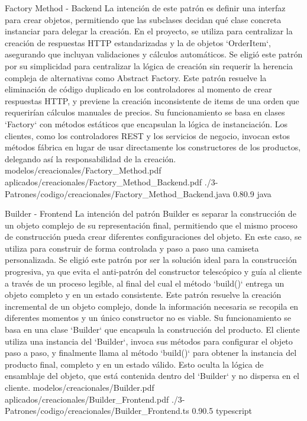 \Patron
    {Factory Method - Backend}
    {La intención de este patrón es definir una interfaz para crear objetos, permitiendo que las subclases decidan qué clase concreta instanciar para delegar la creación. En el proyecto, se utiliza para centralizar la creación de respuestas HTTP estandarizadas y la de objetos `OrderItem`, asegurando que incluyan validaciones y cálculos automáticos. Se eligió este patrón por su simplicidad para centralizar la lógica de creación sin requerir la herencia compleja de alternativas como Abstract Factory.}
    {Este patrón resuelve la eliminación de código duplicado en los controladores al momento de crear respuestas HTTP, y previene la creación inconsistente de items de una orden que requerirían cálculos manuales de precios. Su funcionamiento se basa en clases `Factory` con métodos estáticos que encapsulan la lógica de instanciación. Los clientes, como los controladores REST y los servicios de negocio, invocan estos métodos fábrica en lugar de usar directamente los constructores de los productos, delegando así la responsabilidad de la creación.}
    {modelos/creacionales/Factory_Method.pdf}
    {aplicados/creacionales/Factory_Method_Backend.pdf}
    {./3-Patrones/codigo/creacionales/Factory_Method_Backend.java}
    {0.8}{0.9}
    {java}
\newpage

\Patron
    {Builder - Frontend}
    {La intención del patrón Builder es separar la construcción de un objeto complejo de su representación final, permitiendo que el mismo proceso de construcción pueda crear diferentes configuraciones del objeto. En este caso, se utiliza para construir de forma controlada y paso a paso una camiseta personalizada. Se eligió este patrón por ser la solución ideal para la construcción progresiva, ya que evita el anti-patrón del constructor telescópico y guía al cliente a través de un proceso legible, al final del cual el método `build()` entrega un objeto completo y en un estado consistente.}
    {Este patrón resuelve la creación incremental de un objeto complejo, donde la información necesaria se recopila en diferentes momentos y un único constructor no es viable. Su funcionamiento se basa en una clase `Builder` que encapsula la construcción del producto. El cliente utiliza una instancia del `Builder`, invoca sus métodos para configurar el objeto paso a paso, y finalmente llama al método `build()` para obtener la instancia del producto final, completo y en un estado válido. Esto oculta la lógica de ensamblaje del objeto, que está contenida dentro del `Builder` y no dispersa en el cliente.}
    {modelos/creacionales/Builder.pdf}
    {aplicados/creacionales/Builder_Frontend.pdf}
    {./3-Patrones/codigo/creacionales/Builder_Frontend.ts}
    {0.9}{0.5}
    {typescript}
\newpage


